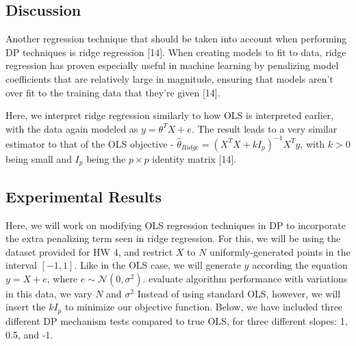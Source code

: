 \documentclass[11pt,conference]{IEEEtran}
\newcommand{\Normal}{\mathcal{N}}
\begin{document}
\textcolor{brown}{}

\subsection{Discussion}
Another regression technique that should be taken into account when performing DP techniques is ridge regression [14]. When creating models to fit to data, ridge regression has proven especially useful in machine learning by penalizing model coefficients that are relatively large in magnitude, ensuring that models aren't over fit to the training data that they're given [14]. 

Here, we interpret ridge regression similarly to how OLS is interpreted earlier, with the data again modeled as $y= \theta^T X+e$. The result leads to a very similar estimator to that of the OLS objective - $\hat{\theta}_{Ridge} = (X^T X + kI_p)^{-1}X^T y$, with $k > 0$ being small and $I_p$ being the $p \times p$ identity matrix [14]. 

\subsection{Experimental Results}
Here, we will work on modifying OLS regression techniques in DP to incorporate the extra penalizing term seen in ridge regression. For this, we will be using the dataset provided for HW 4, and restrict $X$ to $N$ uniformly-generated points in the interval $[-1,1]$. Like in the OLS case, we will generate $y$ according the equation $y=X+e$, where $e\sim \Normal(0,\sigma^2)$. evaluate algorithm performance with variations in this data, we vary $N$ and $\sigma^2$ Instead of using standard OLS, however, we will insert the $kI_p$ to minimize our objective function. Below, we have included three different DP mechanism tests compared to true OLS, for three different slopes: 1, 0.5, and -1. 
\end{document}
